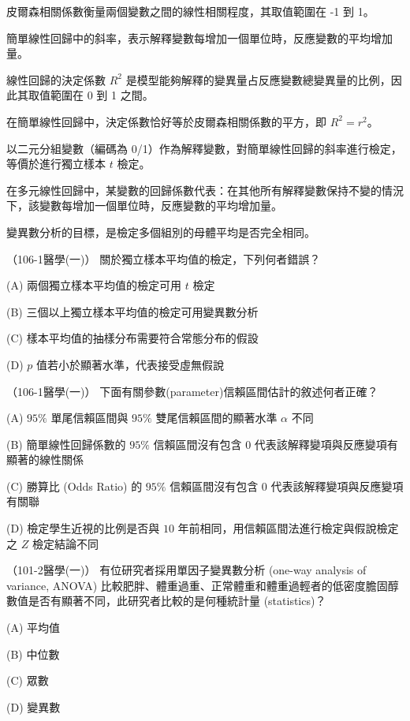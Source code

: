     \bigskip

    \begin{takehome}
        \item 皮爾森相關係數衡量兩個變數之間的線性相關程度，其取值範圍在 -1 到 1。
        \item 簡單線性回歸中的斜率，表示解釋變數每增加一個單位時，反應變數的平均增加量。
        \item 線性回歸的決定係數 $R^2$ 是模型能夠解釋的變異量占反應變數總變異量的比例，因此其取值範圍在 0 到 1 之間。
        \item 在簡單線性回歸中，決定係數恰好等於皮爾森相關係數的平方，即 $R^2 = r^2$。
        \item 以二元分組變數（編碼為 0/1）作為解釋變數，對簡單線性回歸的斜率進行檢定，等價於進行獨立樣本 $t$ 檢定。
        \item 在多元線性回歸中，某變數的回歸係數代表：在其他所有解釋變數保持不變的情況下，該變數每增加一個單位時，反應變數的平均增加量。
        \item 變異數分析的目標，是檢定多個組別的母體平均是否完全相同。
    \end{takehome}
  
    \begin{docexam}{（106-1醫學(一)）}
        關於獨立樣本平均值的檢定，下列何者錯誤？

        (A) 兩個獨立樣本平均值的檢定可用 $t$ 檢定

        (B) 三個以上獨立樣本平均值的檢定可用變異數分析

        (C) 樣本平均值的抽樣分布需要符合常態分布的假設

        (D) $p$ 值若小於顯著水準，代表接受虛無假說
    \end{docexam}
    
    \begin{docexam}{（106-1醫學(一)）}
        下面有關參數(parameter)信賴區間估計的敘述何者正確？

        (A) $95\%$ 單尾信賴區間與 $95\%$ 雙尾信賴區間的顯著水準 $\alpha$ 不同
        
        (B) 簡單線性回歸係數的 $95\%$ 信賴區間沒有包含 $0$ 代表該解釋變項與反應變項有顯著的線性關係

        (C) 勝算比 (Odds Ratio) 的 $95\%$ 信賴區間沒有包含 $0$ 代表該解釋變項與反應變項有關聯

        (D) 檢定學生近視的比例是否與 $10$ 年前相同，用信賴區間法進行檢定與假說檢定之 $Z$ 檢定結論不同
    \end{docexam}
    
    \begin{docexam}{（101-2醫學(一)）}
        有位研究者採用單因子變異數分析 (one-way analysis of variance, ANOVA) 比較肥胖、體重過重、正常體重和體重過輕者的低密度膽固醇數值是否有顯著不同，此研究者比較的是何種統計量 (statistics)？

        (A) 平均值
        
        (B) 中位數

        (C) 眾數

        (D) 變異數
    \end{docexam}
    
